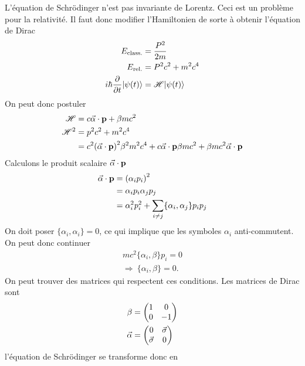 L'équation de Schrödinger n'est pas invariante de Lorentz. Ceci est un problème
pour la relativité. Il faut donc modifier l'Hamiltonien de sorte à obtenir
l'équation de Dirac
\begin{align}
    E_{\rm class.}&=\frac{P^2}{2m}\\
    E_{\rm rel.}&=P^2c^2+m^2c^4\\
    i\hbar\pdv{t} |{\psi(t)}\rangle&=\mathscr{H}|{\psi(t)}\rangle
\end{align}
On peut donc postuler
\begin{align}
    \mathscr{H}&=c\va{\alpha}\cdot\vb{p}+\beta mc^2\\
    \mathscr{H}^2&=p^2c^2+m^2c^4\\
                 &=c^2\qty(\va{\alpha}\cdot\vb{p})^2\beta^2m^2c^4+
                 c\va{\alpha}\cdot\vb{p}\beta mc^2+\beta mc^2\va{\alpha}\cdot\vb{p}
\end{align}
Calculons le produit scalaire $\va{\alpha}\cdot\vb{p}$
\begin{align}
    \va{\alpha}\cdot\vb{p}&=\qty(\alpha_ip_i)^2\\
                          &=\alpha_ip_i\alpha_jp_j\\
                          &=\alpha_i^2p_i^2+\sum_{i\neq j}\{\alpha_i,\alpha_j\}
                          p_ip_j
\end{align}
On doit poser $\{\alpha_i,\alpha_i\}=0$, ce qui implique que les symboles
$\alpha_i$ anti-commutent. On peut donc continuer
\begin{align}
    mc^2\{\alpha_i,\beta\}p_i=0\\
    \Rightarrow\ \{\alpha_i,\beta\}=0.
\end{align}
On peut trouver des matrices qui respectent ces conditions. Les matrices de Dirac
sont
\begin{align}
    \beta&=
    \begin{pmatrix}
        1 & 0 \\ 0 & -1
    \end{pmatrix}\\
    \va{\alpha}&=
    \begin{pmatrix}
        0 & \va{\sigma}\\
        \va{\sigma} & 0
    \end{pmatrix}
\end{align}
l'équation de Schrödinger se transforme donc en
